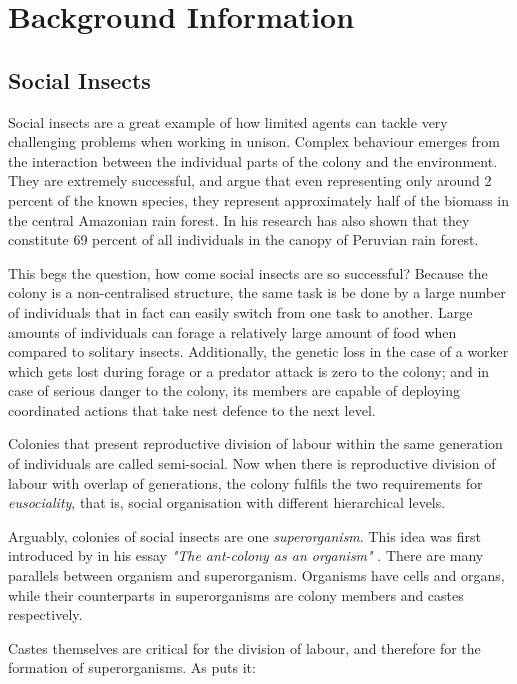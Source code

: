 \chapter{Background Information}
\label{ch:background-information}

\section {Social Insects}

Social insects are a great example of how limited agents can tackle very challenging problems when working in unison. Complex behaviour emerges from the interaction between the individual parts of the colony and the environment. They are extremely successful, and \citeauthor{Fittkau1973} argue that even representing only around 2 percent of the known species, they represent approximately  half of the biomass in the central Amazonian rain forest. In his research \citeauthor{erwin1989} has also shown that they constitute 69 percent of all individuals in the canopy of Peruvian rain forest.

This begs the question, how come social insects are so successful? Because the colony is a non-centralised structure, the same task is be done by a large number of individuals that in fact can easily switch from one task to another. Large amounts of individuals can forage a relatively large amount of food when compared to solitary insects. Additionally, the genetic loss in the case of a worker which gets lost during forage or a predator attack is zero to the colony; and in case of serious danger to the colony, its members are capable of deploying coordinated actions that take nest defence to the next level.

Colonies that present reproductive division of labour within the same generation of individuals are called semi-social. Now when there is reproductive division of labour with overlap of generations, the colony fulfils the two requirements for \emph{eusociality}, that is, social organisation with different hierarchical levels.   

Arguably, colonies of social insects are one \emph{superorganism}. This idea was first introduced by \citeauthor{JMOR:JMOR1050220206} in his essay \emph{"The ant-colony as an organism"} \cite{JMOR:JMOR1050220206}. There are many parallels between organism and superorganism. Organisms have cells and organs, while their counterparts in superorganisms are colony members and castes respectively. 

Castes themselves are critical for the division of labour, and therefore for the formation of superorganisms. As \citeauthor{citeulike:3731267} puts it:

